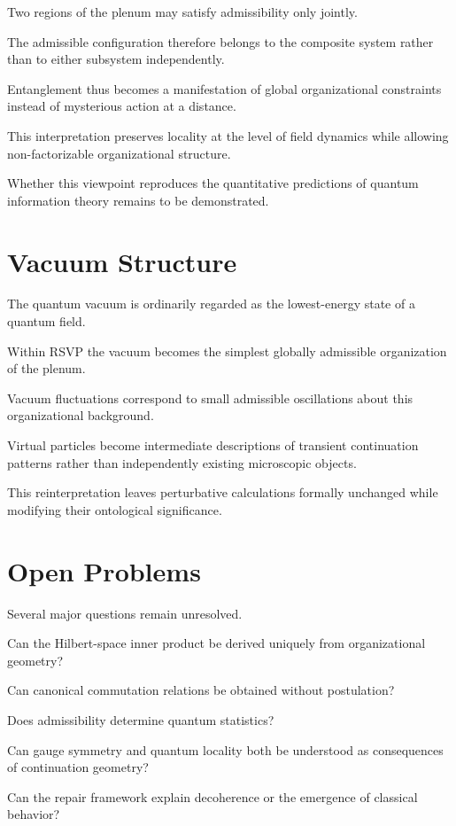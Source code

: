 \documentclass[11pt,oneside]{book}
\numberwithin{equation}{chapter}
\theoremstyle{definition}
\theoremstyle{plain}
\begin{document}
Two regions of the plenum may satisfy admissibility only jointly.

The admissible configuration therefore belongs to the composite system
rather than to either subsystem independently.

Entanglement thus becomes a manifestation of global organizational
constraints instead of mysterious action at a distance.

This interpretation preserves locality at the level of field dynamics while
allowing non-factorizable organizational structure.

Whether this viewpoint reproduces the quantitative predictions of quantum
information theory remains to be demonstrated.

\section{Vacuum Structure}

The quantum vacuum is ordinarily regarded as the lowest-energy state of a
quantum field.

Within RSVP the vacuum becomes the simplest globally admissible organization
of the plenum.

Vacuum fluctuations correspond to small admissible oscillations about this
organizational background.

Virtual particles become intermediate descriptions of transient continuation
patterns rather than independently existing microscopic objects.

This reinterpretation leaves perturbative calculations formally unchanged
while modifying their ontological significance.

\section{Open Problems}

Several major questions remain unresolved.

Can the Hilbert-space inner product be derived uniquely from organizational
geometry?

Can canonical commutation relations be obtained without postulation?

Does admissibility determine quantum statistics?

Can gauge symmetry and quantum locality both be understood as consequences
of continuation geometry?

Can the repair framework explain decoherence or the emergence of classical
behavior?
\end{document}
